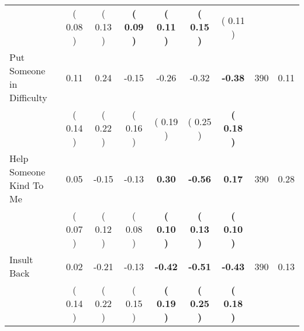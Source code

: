 \begin{tabular}{lcccccccc}
 & (     0.08 ) & (     0.13 ) & \textbf{(     0.09 )} & \textbf{(     0.11 )} & \textbf{(     0.15 )} & (     0.11 ) & \\
Put Someone in Difficulty &      0.11 &      0.24 &     -0.15 &     -0.26 &     -0.32 & \textbf{    -0.38} & 390 &       0.11 \\ 
 & (     0.14 ) & (     0.22 ) & (     0.16 ) & (     0.19 ) & (     0.25 ) & \textbf{(     0.18 )} & \\
Help Someone Kind To Me &      0.05 &     -0.15 &     -0.13 & \textbf{     0.30} & \textbf{    -0.56} & \textbf{     0.17} & 390 &       0.28 \\ 
 & (     0.07 ) & (     0.12 ) & (     0.08 ) & \textbf{(     0.10 )} & \textbf{(     0.13 )} & \textbf{(     0.10 )} & \\
Insult Back &      0.02 &     -0.21 &     -0.13 & \textbf{    -0.42} & \textbf{    -0.51} & \textbf{    -0.43} & 390 &       0.13 \\ 
 & (     0.14 ) & (     0.22 ) & (     0.15 ) & \textbf{(     0.19 )} & \textbf{(     0.25 )} & \textbf{(     0.18 )} & \\
\bottomrule
\end{tabular}
